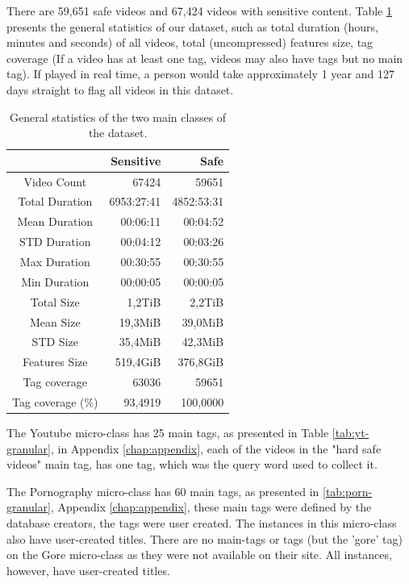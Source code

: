 There are 59,651 safe videos and 67,424 videos with sensitive content. Table \ref{tab:general-stats} presents the general statistics of our dataset, such as total duration (hours, minutes and seconds) of all videos, total (uncompressed) features size, tag coverage (If a video has at least one tag, videos may also have tags but no main tag). If played in real time, a person would take approximately 1 year and 127 days straight to flag all videos in this dataset.

\begin{table}
\centering
\caption{General statistics of the two main classes of the dataset.}
\begin{tabular}{c|r|r} 
\multicolumn{1}{l|}{} & Sensitive  & Safe        \\ 
\hline
Video Count           & 67424      & 59651       \\ 
\hline
Total Duration        & 6953:27:41 & 4852:53:31  \\ 
\hline
Mean Duration         & 00:06:11   & 00:04:52    \\ 
\hline
STD Duration          & 00:04:12   & 00:03:26    \\ 
\hline
Max Duration          & 00:30:55   & 00:30:55    \\ 
\hline
Min Duration          & 00:00:05   & 00:00:05    \\ 
\hline
Total Size            & 1,2TiB     & 2,2TiB      \\ 
\hline
Mean Size             & 19,3MiB    & 39,0MiB     \\ 
\hline
STD Size              & 35,4MiB    & 42,3MiB     \\ 
\hline
Features Size         & 519,4GiB   & 376,8GiB    \\ 
\hline
Tag coverage          & 63036      & 59651       \\ 
\hline
Tag coverage (\%)     & 93,4919    & 100,0000     \\
\end{tabular}
\label{tab:general-stats}
\end{table}

The Youtube micro-class has 25 main tags, as presented in Table \ref{tab:yt-granular}, in Appendix \ref{chap:appendix}, each of the videos in the "hard safe videos" main tag, has one tag, which was the query word used to collect it.

The Pornography micro-class has 60 main tags, as presented in \ref{tab:porn-granular}, Appendix \ref{chap:appendix}, these main tags were defined by the database creators, the tags were user created. The instances in this micro-class also have user-created titles.
There are no main-tags or tags (but the 'gore' tag) on the Gore micro-class as they were not available on their site. All instances, however, have user-created titles.

